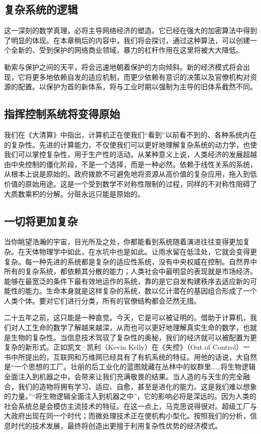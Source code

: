 \subsection{复杂系统的逻辑}
这一深刻的数学真理，必将主导网络经济的塑造。它已经在强大的加密算法中得到了明显的体现。在本章稍后的内容中，我们将会探讨，通过这种算法，可以创建一个全新的、受到保护的网络商业领域，暴力的杠杆作用在这里将被大大降低。

勒索与保护之间的天平，将会迅速地朝着保护的方向倾斜。新的经济模式将会出现，它将更多地依赖自发的适应机制，而更少依赖有意识的决策以及官僚机构对资源的配置。以保护为首的新体系，将与工业时期以强制为主导的旧体系截然不同。

\subsection{指挥控制系统将变得原始}
我们在《大清算》中指出，计算机正在使我们“看到”以前看不到的、各种系统内在的复杂性。先进的计算能力，不仅使我们可以更好地理解复杂系统的动力学，也使我们可以掌控复杂性，用于生产性的活动。从某种意义上说，人类经济的发展超越由中央控制的僵化阶段，不是一个选择，而是一种必然。依赖于线性关系的系统，从根本上说是原始的。政府拨款不可避免地将资源从高价值的复杂应用，拖入到低价值的原始用途。这是一个受到数学不对称性限制的过程，同样的不对称性阻碍了大质数乘积的分解。分赃永远只能是原始的。

\subsection{一切将更加复杂}
当你眺望浩瀚的宇宙，目光所及之处，你都能看到系统随着演进往往变得更加复杂。在天体物理学中如此，在水坑中也是如此。让雨水留在低洼处，它就会变得更复杂。每一种先进的系统都是复杂的适应性系统，没有中央权威在控制。自然界中所有的复杂系统，都依赖其分散的能力；人类社会中最明显的表现就是市场经济。能够在最宽泛的条件下最有效地运作的系统，靠的是它自发构建秩序去适应新的可能性的能力。生命本身就是这样复杂的系统，数以亿计潜在的基因组合形成了一个人类个体。要对它们进行分类，所有的官僚结构都会茫然无措。

二十五年之前，这只能是一种直觉。今天，它是可以被证明的。借助于计算机，我们对人工生命的数学了解越来越深，从而也可以更好地理解真实生命的数学，也就是生物的复杂性。当信息技术驾驭了复杂性的奥秘，我们的经济就可以被配置为更复杂的新形式。正如凯文·凯利（Kevin Kelly）在《失控》（Out of Control）一书中所提出的，互联网和万维网已经具有了有机系统的特征。用他的话说，大自然是“一个思想的工厂。壮丽的后工业化的蓝图就藏在丛林中的蚁群里……将生物逻辑全面注入到机器之中，会带来让我们充满敬畏的结果。当人造的与天生的完全融合，我们的造物将拥有学习、适应、自愈，甚至是进化的能力。这是我们难以想象的力量。”“将生物逻辑全面注入到机器之中”，它的影响必将是深远的。因为人类的社会系统总是会模仿主流技术的特征。在这一点上，马克思说得很对。超级工厂与大政府出现在同一个时代；而微处理技术正在使机构小型化。按照我们的分析，信息时代的技术发展，最终将创造出更擅于利用复杂性优势的经济模式。

